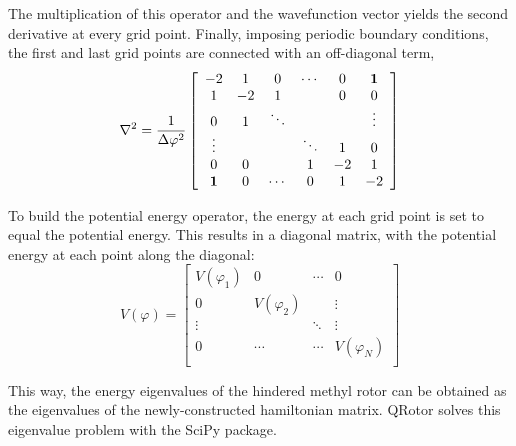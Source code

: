 \documentclass[12pt,a4paper]{article}
\begin{document}
The multiplication of this operator and the wavefunction vector yields the second derivative at every grid point.
Finally, imposing periodic boundary conditions, the first and last grid points are connected with an off-diagonal term,
\[
    \nabla^2 = \frac{1}{\Delta\varphi^2}
    \left[ {\begin{array}{cccccc}
    -2      &  1     &  0     & \cdots &  0    &  \bf{1} \\
     1      & -2     &  1     &        &  0    &  0      \\
     0      &  1     & \ddots &        &       &  \vdots \\
     \vdots &        &        & \ddots &  1    &  0      \\
     0      &  0     &        &  1     & -2    &  1      \\
     \bf{1} &  0     & \cdots &  0     &  1    & -2      \\
    \end{array} } \right]
\]

To build the potential energy operator, the energy at each grid point is set to equal the potential energy.
This results in a diagonal matrix, with the potential energy at each point along the diagonal:
\[
    V(\varphi) =
    \left[ {\begin{array}{cccc}
    V(\varphi_1) &  0            &  \cdots &  0          \\
     0           &  V(\varphi_2) &         &  \vdots     \\
     \vdots      &               &  \ddots &   \vdots     \\
     0           &   \cdots      &  \cdots & V(\varphi_N) \\
    \end{array} } \right]
\]

This way, the energy eigenvalues of the hindered methyl rotor can be obtained as the eigenvalues of the newly-constructed hamiltonian matrix. QRotor solves this eigenvalue problem with the SciPy package.

\end{document}
